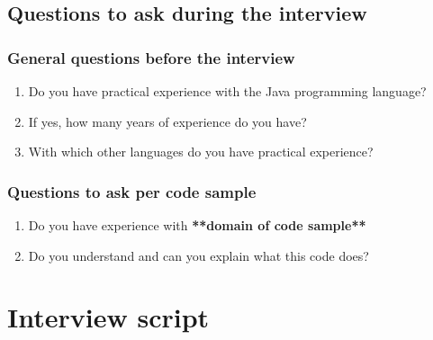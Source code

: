 \subsection{Questions to ask during the interview}

\subsubsection{General questions before the interview}

\begin{enumerate}
\item Do you have practical experience with the Java programming language?
\item If yes, how many years of experience do you have?
\item With which other languages do you have practical experience?
\end{enumerate}

\subsubsection{Questions to ask per code sample}
\begin{enumerate}
\item Do you have experience with \textbf{**domain of code sample**}
\item Do you understand and can you explain what this code does?
\end{enumerate}

\section{Interview script}

